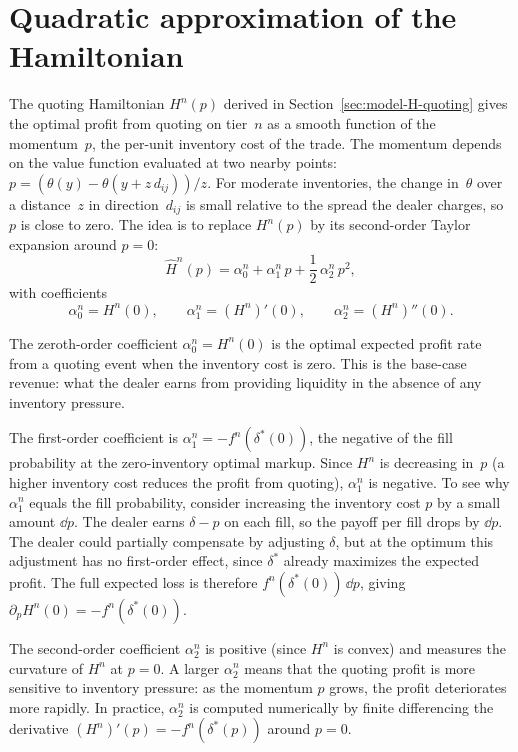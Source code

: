 \section{Quadratic approximation of the Hamiltonian}
\label{sec:ode-quadratic-H}

The quoting Hamiltonian $H^n(p)$ derived in Section~\ref{sec:model-H-quoting} gives the optimal profit from quoting on tier~$n$ as a smooth function of the momentum~$p$, the per-unit inventory cost of the trade. The momentum depends on the value function evaluated at two nearby points: $p = (\theta(y) - \theta(y + z\,d_{ij}))/z$. For moderate inventories, the change in~$\theta$ over a distance~$z$ in direction~$d_{ij}$ is small relative to the spread the dealer charges, so $p$ is close to zero. The idea is to replace $H^n(p)$ by its second-order Taylor expansion around $p = 0$:
\begin{equation}
  \label{eq:H-quadratic}
  \hat{H}^n(p) = \alpha_0^n + \alpha_1^n\, p + \frac{1}{2}\,\alpha_2^n\, p^2,
\end{equation}
with coefficients
\begin{equation}
  \label{eq:H-taylor-coeffs}
  \alpha_0^n = H^n(0), \qquad
  \alpha_1^n = (H^n)'(0), \qquad
  \alpha_2^n = (H^n)''(0).
\end{equation}

The zeroth-order coefficient $\alpha_0^n = H^n(0)$ is the optimal expected profit rate from a quoting event when the inventory cost is zero. This is the base-case revenue: what the dealer earns from providing liquidity in the absence of any inventory pressure.

The first-order coefficient is $\alpha_1^n = -f^n(\delta^*(0))$, the negative of the fill probability at the zero-inventory optimal markup. Since $H^n$ is decreasing in~$p$ (a higher inventory cost reduces the profit from quoting), $\alpha_1^n$ is negative. To see why $\alpha_1^n$ equals the fill probability, consider increasing the inventory cost $p$ by a small amount $\dd p$. The dealer earns $\delta - p$ on each fill, so the payoff per fill drops by $\dd p$. The dealer could partially compensate by adjusting $\delta$, but at the optimum this adjustment has no first-order effect, since $\delta^*$ already maximizes the expected profit. The full expected loss is therefore $f^n(\delta^*(0))\,\dd p$, giving $\partial_p H^n(0) = -f^n(\delta^*(0))$.

The second-order coefficient $\alpha_2^n$ is positive (since $H^n$ is convex) and measures the curvature of $H^n$ at $p = 0$. A larger $\alpha_2^n$ means that the quoting profit is more sensitive to inventory pressure: as the momentum $p$ grows, the profit deteriorates more rapidly. In practice, $\alpha_2^n$ is computed numerically by finite differencing the derivative $(H^n)'(p) = -f^n(\delta^*(p))$ around $p = 0$.

